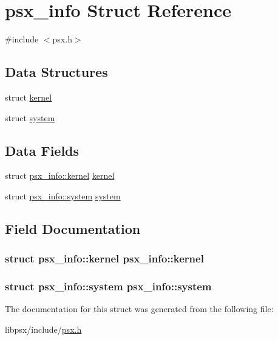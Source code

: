 \hypertarget{structpsx__info}{}\section{psx\+\_\+info Struct Reference}
\label{structpsx__info}


{\ttfamily \#include $<$psx.\+h$>$}

\subsection*{Data Structures}
\begin{DoxyCompactItemize}
\item 
struct \hyperlink{structpsx__info_1_1kernel}{kernel}
\item 
struct \hyperlink{structpsx__info_1_1system}{system}
\end{DoxyCompactItemize}
\subsection*{Data Fields}
\begin{DoxyCompactItemize}
\item 
struct \hyperlink{structpsx__info_1_1kernel}{psx\+\_\+info\+::kernel} \hyperlink{structpsx__info_adeb1aaa7707f76854f8a7f4e403b62c8}{kernel}
\item 
struct \hyperlink{structpsx__info_1_1system}{psx\+\_\+info\+::system} \hyperlink{structpsx__info_a12e85860d4398f8d56ab61da080e91b7}{system}
\end{DoxyCompactItemize}


\subsection{Field Documentation}
\hypertarget{structpsx__info_adeb1aaa7707f76854f8a7f4e403b62c8}{}
\subsubsection[{kernel}]{\setlength{\rightskip}{0pt plus 5cm}struct {\bf psx\+\_\+info\+::kernel} {\bf psx\+\_\+info\+::kernel}}\label{structpsx__info_adeb1aaa7707f76854f8a7f4e403b62c8}
\hypertarget{structpsx__info_a12e85860d4398f8d56ab61da080e91b7}{}
\subsubsection[{system}]{\setlength{\rightskip}{0pt plus 5cm}struct {\bf psx\+\_\+info\+::system} {\bf psx\+\_\+info\+::system}}\label{structpsx__info_a12e85860d4398f8d56ab61da080e91b7}


The documentation for this struct was generated from the following file\+:\begin{DoxyCompactItemize}
\item 
libpsx/include/\hyperlink{psx_8h}{psx.\+h}\end{DoxyCompactItemize}
